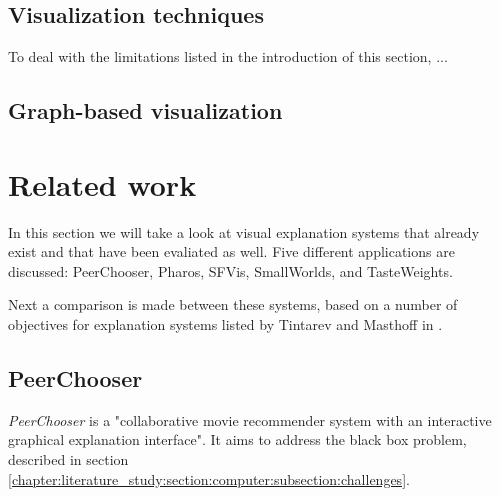 \subsection{Visualization techniques}\label{chapter:literature_study:section:interaction:subsection:techniques}


To deal with the limitations listed in the introduction of this section, ...



\subsection{Graph-based visualization}\label{chapter:literature_study:section:interaction:subsection:graphs}







% 
\section{Related work}\label{chapter:survey:section:applications}

In this section we will take a look at visual explanation systems that already exist and that have been evaliated as well. Five different applications are discussed: PeerChooser, Pharos, SFVis, SmallWorlds, and TasteWeights.

Next a comparison is made between these systems, based on a number of objectives for explanation systems listed by Tintarev and Masthoff in \cite{tintarev:2007:SER:1547550.1547664}.


\subsection{PeerChooser}\label{chapter:survey:section:applications:subsection:peerchooser}

\emph{PeerChooser} is a "collaborative movie recommender system with an interactive graphical explanation interface"\cite{odonovan:2008}. It aims to address the black box problem, described in section \ref{chapter:literature_study:section:computer:subsection:challenges}\cite{odonovan:2008}.

